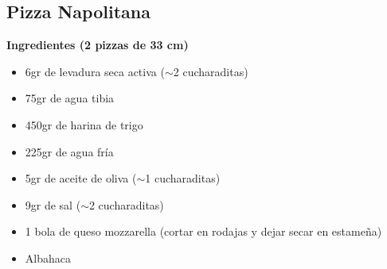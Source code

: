 \subsection{Pizza Napolitana}


\textbf{Ingredientes (2 pizzas de 33 cm)}
\begin{itemize}
\item 6gr de levadura seca activa ($\sim$2 cucharaditas)
\item 75gr de agua tibia
\item 450gr de harina de trigo
\item 225gr de agua fr\'ia
\item 5gr de aceite de oliva ($\sim$1 cucharaditas)
\item 9gr de sal ($\sim$2 cucharaditas)
\item 1 bola de queso mozzarella (cortar en rodajas y dejar secar en estame\~na)
\item Albahaca

\end{itemize}
